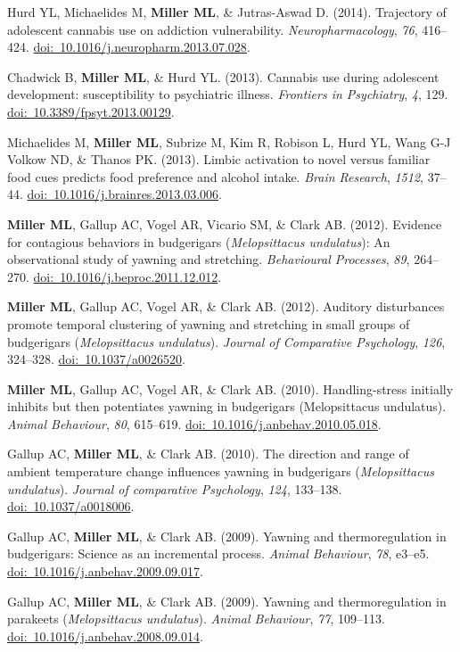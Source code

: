 \documentclass[10pt]{article}
\begin{document}
\begin{description}
\item Hurd YL, Michaelides M, \textbf{Miller ML}, \& Jutras-Aswad D. (2014). Trajectory of adolescent cannabis use on addiction vulnerability. \textit{Neuropharmacology}, \textit{76}, 416--424. \href{https://doi.org/10.1016/j.neuropharm.2013.07.028}{doi:~10.1016/j.neuropharm.2013.07.028}.
\item Chadwick B, \textbf{Miller ML}, \& Hurd YL. (2013). Cannabis use during adolescent development: susceptibility to psychiatric illness. \textit{Frontiers in Psychiatry}, \textit{4}, 129. \href{https://doi.org/10.3389/fpsyt.2013.00129}{doi:~10.3389/fpsyt.2013.00129}.
\item Michaelides M, \textbf{Miller ML}, Subrize M, Kim R, Robison L, Hurd YL, Wang G-J Volkow ND, \& Thanos PK. (2013). Limbic activation to novel versus familiar food cues predicts food preference and alcohol intake. \textit{Brain Research}, \textit{1512}, 37--44. \href{https://doi.org/10.1016/j.brainres.2013.03.006}{doi:~10.1016/j.brainres.2013.03.006}.
\item \textbf{Miller ML}, Gallup AC, Vogel AR, Vicario SM, \& Clark AB. (2012). Evidence for contagious behaviors in budgerigars (\textit{Melopsittacus undulatus}): An observational study of yawning and stretching. \textit{Behavioural Processes}, \textit{89}, 264--270. \href{https://doi.org/10.1016/j.beproc.2011.12.012}{doi:~10.1016/j.beproc.2011.12.012}.
\item \textbf{Miller ML}, Gallup AC, Vogel AR, \& Clark AB. (2012). Auditory disturbances promote temporal clustering of yawning and stretching in small groups of budgerigars (\textit{Melopsittacus undulatus}). \textit{Journal of Comparative Psychology}, \textit{126}, 324--328. \href{https://doi.org/10.1037/a0026520}{doi:~10.1037/a0026520}.
\item \textbf{Miller ML}, Gallup AC, Vogel AR, \& Clark AB. (2010). Handling-stress initially inhibits but then potentiates yawning in budgerigars (Melopsittacus undulatus). \textit{Animal Behaviour}, \textit{80}, 615--619. \href{https://doi.org/10.1016/j.anbehav.2010.05.018}{doi:~10.1016/j.anbehav.2010.05.018}.
\item Gallup AC, \textbf{Miller ML}, \& Clark AB. (2010). The direction and range of ambient temperature change influences yawning in budgerigars (\textit{Melopsittacus undulatus}). \textit{Journal of comparative Psychology}, \textit{124}, 133--138. \href{https://doi.org/10.1037/a0018006}{doi:~10.1037/a0018006}.
\item Gallup AC, \textbf{Miller ML}, \& Clark AB. (2009). Yawning and thermoregulation in budgerigars: Science as an incremental process. \textit{Animal Behaviour}, \textit{78}, e3--e5. \href{https://doi.org/10.1016/j.anbehav.2009.09.017}{doi:~10.1016/j.anbehav.2009.09.017}.
\item Gallup AC, \textbf{Miller ML}, \& Clark AB. (2009). Yawning and thermoregulation in parakeets (\textit{Melopsittacus undulatus}). \textit{Animal Behaviour}, \textit{77}, 109--113. \href{https://doi.org/10.1016/j.anbehav.2008.09.014}{doi:~10.1016/j.anbehav.2008.09.014}.
\end{description}
\end{document}
